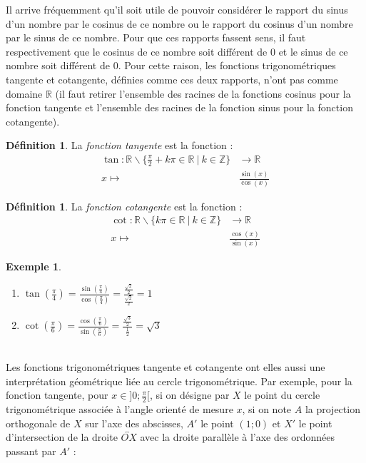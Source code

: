 \documentclass[a4paper,fontsize=13pt]{scrreprt}
\theoremstyle{plain}
\theoremstyle{definition}
\newtheorem{déf}[subsection]{Définition}
\newtheorem{exe}[subsection]{Exemple}
\newcommand{\zz}{\mathbb{Z}}
\newcommand{\rr}{\mathbb{R}}
\begin{document}
Il arrive fréquemment qu'il soit utile de pouvoir considérer le rapport du sinus d'un nombre par le cosinus de ce nombre ou le rapport du cosinus d'un nombre par le sinus de ce nombre. Pour que ces rapports fassent sens, il faut respectivement que le cosinus de ce nombre soit différent de $0$ et le sinus de ce nombre soit différent de $0$. Pour cette raison, les fonctions trigonométriques tangente et cotangente, définies comme ces deux rapports, n'ont pas comme domaine $\rr$ (il faut retirer l'ensemble des racines de la fonctions cosinus pour la fonction tangente et l'ensemble des racines de la fonction sinus pour la fonction cotangente).
\begin{déf}
La \emph{fonction tangente} est la fonction :
\begin{align*}
		\tan : \rr \backslash \{\frac{\pi}{2}+k\pi \in \rr ~|~k \in \zz\} &\to \rr \\
		x \mapsto& \frac{\sin(x)}{\cos(x)}
		\end{align*}
\end{déf}
\begin{déf}
La \emph{fonction cotangente} est la fonction :
\begin{align*}
		\cot : \rr \backslash \{k\pi \in \rr ~|~k \in \zz\} &\to \rr \\
		x \mapsto& \frac{\cos(x)}{\sin(x)}
		\end{align*}
\end{déf}
\begin{exe} ~\\
\begin{enumerate}
\item $\tan(\frac{\pi}{4}) = \frac{\sin(\frac{\pi}{4})}{\cos(\frac{\pi}{4})} = \frac{\frac{\sqrt{2}}{2}}{\frac{\sqrt{2}}{2}} = 1$
\item $\cot(\frac{\pi}{6}) = \frac{\cos(\frac{\pi}{6})}{\sin(\frac{\pi}{6})} = \frac{\frac{\sqrt{3}}{2}}{\frac{1}{2}} = \sqrt{3}$
		\end{enumerate}
\end{exe}
~\\
Les fonctions trigonométriques tangente et cotangente ont elles aussi une interprétation géométrique liée au cercle trigonométrique. Par exemple, pour la fonction tangente, pour $x \in ]0;\frac{\pi}{2}[$, si on désigne par $X$ le point du cercle trigonométrique associée à l'angle orienté de mesure $x$, si on note $A$ la projection orthogonale de $X$ sur l'axe des abscisses, $A'$ le point $(1;0)$ et $X'$ le point d'intersection de la droite $\overleftrightarrow{OX}$ avec la droite parallèle à l'axe des ordonnées passant par $A'$ :
\end{document}
